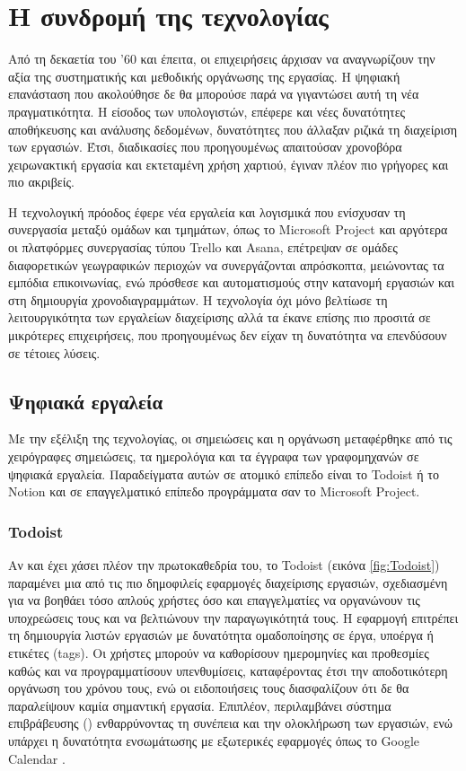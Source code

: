     \section{Η συνδρομή της τεχνολογίας}
        Από τη δεκαετία του '60 και έπειτα, οι επιχειρήσεις άρχισαν να αναγνωρίζουν την αξία της συστηματικής και μεθοδικής οργάνωσης της εργασίας. Η ψηφιακή επανάσταση που ακολούθησε δε θα μπορούσε παρά να γιγαντώσει αυτή τη νέα πραγματικότητα. Η είσοδος των υπολογιστών, επέφερε και νέες δυνατότητες αποθήκευσης και ανάλυσης δεδομένων, δυνατότητες που άλλαξαν ριζικά τη διαχείριση των εργασιών. Έτσι, διαδικασίες που προηγουμένως απαιτούσαν χρονοβόρα χειρωνακτική εργασία και εκτεταμένη χρήση χαρτιού, έγιναν πλέον πιο γρήγορες και πιο ακριβείς.

        Η τεχνολογική πρόοδος έφερε νέα εργαλεία και λογισμικά που ενίσχυσαν τη συνεργασία μεταξύ ομάδων και τμημάτων, όπως το Microsoft Project και αργότερα οι πλατφόρμες συνεργασίας τύπου Trello και Asana, επέτρεψαν σε ομάδες διαφορετικών γεωγραφικών περιοχών να συνεργάζονται απρόσκοπτα, μειώνοντας τα εμπόδια επικοινωνίας, ενώ πρόσθεσε και αυτοματισμούς στην κατανομή εργασιών και στη δημιουργία χρονοδιαγραμμάτων. Η τεχνολογία όχι μόνο βελτίωσε τη λειτουργικότητα των εργαλείων διαχείρισης αλλά τα έκανε επίσης πιο προσιτά σε μικρότερες επιχειρήσεις, που προηγουμένως δεν είχαν τη δυνατότητα να επενδύσουν σε τέτοιες λύσεις.

        \subsection{Ψηφιακά εργαλεία} \label{sec:digitaltools}
            Με την εξέλιξη της τεχνολογίας, οι σημειώσεις και η οργάνωση μεταφέρθηκε από τις χειρόγραφες σημειώσεις, τα ημερολόγια και τα έγγραφα των γραφομηχανών σε ψηφιακά εργαλεία. Παραδείγματα αυτών σε ατομικό επίπεδο είναι το Todoist ή το Notion και σε επαγγελματικό επίπεδο προγράμματα σαν το Microsoft Project.

            \subsubsection{Todoist}
                Αν και έχει χάσει πλέον την πρωτοκαθεδρία του, το Todoist (εικόνα \ref{fig:Todoist}) παραμένει μια από τις πιο δημοφιλείς εφαρμογές διαχείρισης εργασιών, σχεδιασμένη για να βοηθάει τόσο απλούς χρήστες όσο και επαγγελματίες να οργανώνουν τις υποχρεώσεις τους και να βελτιώνουν την παραγωγικότητά τους. Η εφαρμογή επιτρέπει τη δημιουργία λιστών εργασιών με δυνατότητα ομαδοποίησης σε έργα, υποέργα ή ετικέτες (tags). Οι χρήστες μπορούν να καθορίσουν ημερομηνίες και προθεσμίες καθώς και να προγραμματίσουν υπενθυμίσεις, καταφέροντας έτσι την αποδοτικότερη οργάνωση του χρόνου τους, ενώ οι ειδοποιήσεις τους διασφαλίζουν ότι δε θα παραλείψουν καμία σημαντική εργασία. Επιπλέον, περιλαμβάνει σύστημα επιβράβευσης () ενθαρρύνοντας τη συνέπεια και την ολοκλήρωση των εργασιών, ενώ υπάρχει η δυνατότητα ενσωμάτωσης με εξωτερικές εφαρμογές όπως το Google Calendar \cite{Todoist}.

